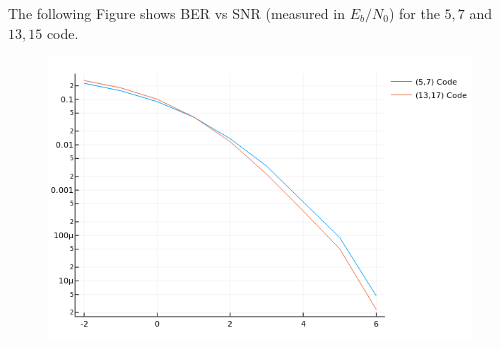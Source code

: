 The following Figure shows BER vs SNR (measured in $E_b/N_0$) for the $5,7$ and $13,15$ code.

\begin{figure}[ht]
  \includegraphics[scale=0.5]{images/convcodes_1_4.png}
\end{figure}



